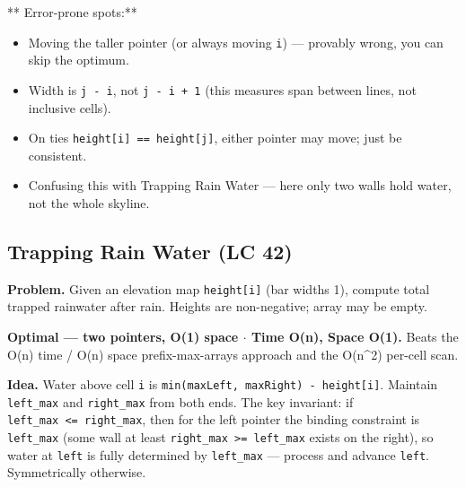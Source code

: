 \documentclass[11pt]{article}
\providecommand{\tightlist}{\setlength{\itemsep}{1pt}\setlength{\parskip}{0pt}}
\begin{document}
** Error-prone spots:**

\begin{itemize}
\tightlist
\item
  Moving the taller pointer (or always moving \texttt{i}) --- provably wrong, you can skip the optimum.
\item
  Width is \texttt{j\ -\ i}, not \texttt{j\ -\ i\ +\ 1} (this measures span between lines, not inclusive cells).
\item
  On ties \texttt{height{[}i{]}\ ==\ height{[}j{]}}, either pointer may move; just be consistent.
\item
  Confusing this with Trapping Rain Water --- here only two walls hold water, not the whole skyline.
\end{itemize}

\subsection{Trapping Rain Water (LC 42)}\label{trapping-rain-water-lc-42}

\textbf{Problem.} Given an elevation map \texttt{height{[}i{]}} (bar widths 1), compute total trapped rainwater after rain. Heights are non-negative; array may be empty.

\textbf{Optimal --- two pointers, O(1) space \(\cdot\) Time O(n), Space O(1).} Beats the O(n) time / O(n) space prefix-max-arrays approach and the O(n\^{}2) per-cell scan.

\textbf{Idea.} Water above cell \texttt{i} is \texttt{min(maxLeft,\ maxRight)\ -\ height{[}i{]}}. Maintain \texttt{left\_max} and \texttt{right\_max} from both ends. The key invariant: if \texttt{left\_max\ \textless{}=\ right\_max}, then for the left pointer the binding constraint is \texttt{left\_max} (some wall at least \texttt{right\_max\ \textgreater{}=\ left\_max} exists on the right), so water at \texttt{left} is fully determined by \texttt{left\_max} --- process and advance \texttt{left}. Symmetrically otherwise.

\end{document}
